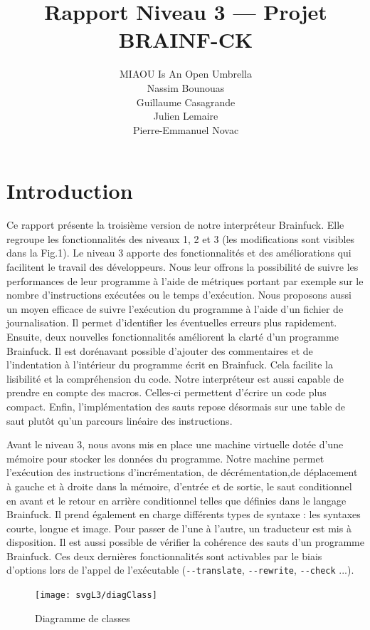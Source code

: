 \documentclass[titlepage]{article}
\author{MIAOU Is An Open Umbrella\\Nassim Bounouas\\Guillaume Casagrande\\Julien Lemaire\\Pierre-Emmanuel Novac}
\title{\vspace{-1cm}Rapport Niveau 3 --- Projet BRAINF-CK}
\begin{document}
\maketitle

\section{Introduction}

    Ce rapport présente la troisième version de notre interpréteur Brainfuck. Elle regroupe les fonctionnalités des niveaux 1, 2 et 3 (les modifications sont visibles dans la Fig.1).
    Le niveau 3 apporte des fonctionnalités et des améliorations qui facilitent le travail des développeurs. Nous leur offrons la possibilité de suivre les performances de leur programme à l’aide de métriques portant par exemple sur le nombre d'instructions exécutées ou le temps d'exécution. Nous proposons aussi un moyen efficace de suivre l’exécution du programme à l'aide d'un fichier de journalisation. Il permet d’identifier les éventuelles erreurs plus rapidement. Ensuite, deux nouvelles fonctionnalités améliorent la clarté d'un programme Brainfuck. Il est dorénavant possible d’ajouter des commentaires et de l'indentation à l’intérieur du programme écrit en Brainfuck. Cela facilite la lisibilité et la compréhension du code. Notre interpréteur est aussi capable de prendre en compte des macros. Celles-ci permettent d’écrire un code plus compact. Enfin, l'implémentation des sauts repose désormais sur une table de saut plutôt qu'un parcours linéaire des instructions.

    Avant le niveau 3, nous avons mis en place une machine virtuelle dotée d'une mémoire pour stocker les données du programme. Notre machine permet l'exécution des instructions d'incrémentation, de décrémentation,de déplacement à gauche et à droite dans la mémoire, d'entrée et de sortie, le saut conditionnel en avant et le retour en arrière conditionnel telles que définies dans le langage Brainfuck. Il prend également en charge différents types de syntaxe : les syntaxes courte, longue et image. Pour passer de l’une à l’autre, un traducteur est mis à disposition. Il est aussi possible de vérifier la cohérence des sauts d’un programme Brainfuck. Ces deux dernières fonctionnalités sont activables par le biais d'options lors de l'appel de l'exécutable (\texttt{-{}-translate}, \texttt{-{}-rewrite}, \texttt{-{}-check} ...).

\begin{figure}[!ht]
	\centering
	\texttt{[image: svgL3/diagClass]}
	\caption{Diagramme de classes}
\end{figure}
\end{document}
